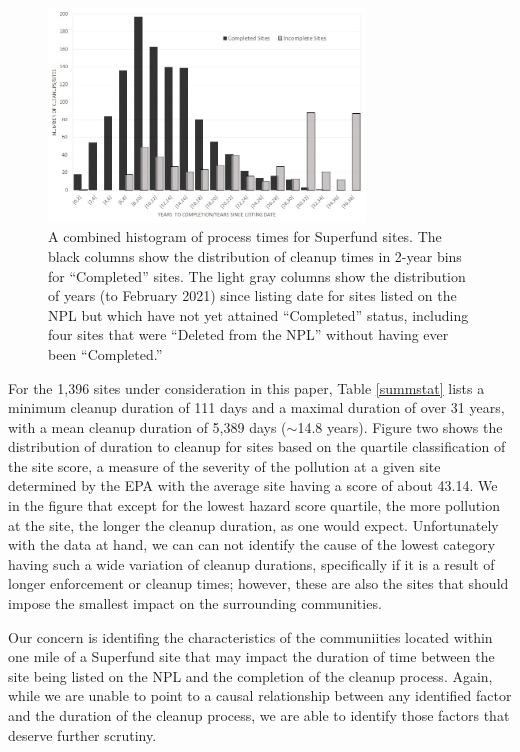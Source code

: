 \documentclass[12pt]{article}
\begin{document}
\begin{figure}[t] \centering
\includegraphics[width=0.75\textwidth]{histogram_combined.jpg}
\caption{A combined histogram of process times for Superfund sites. The black columns show the distribution of cleanup times in 2-year bins for ``Completed'' sites. The light gray columns show the distribution of years (to February 2021) since listing date for sites listed on the NPL but which have not yet attained ``Completed'' status, including four sites that were ``Deleted from the NPL'' without having ever been ``Completed.''
\label{hist1}}
\end{figure}

For the 1,396 sites under consideration in this paper, Table \ref{summstat} lists a minimum cleanup duration of 111 days and a maximal duration of over 31 years, with a mean cleanup duration of 5,389 days ($\sim$14.8 years). Figure two shows the distribution of duration to cleanup for sites based on the quartile classification of the site score, a measure of the severity of the pollution at a given site determined by the EPA with the average site having a score of about 43.14. We in the figure that except for the lowest hazard score quartile, the more pollution at the site, the longer the cleanup duration, as one would expect. Unfortunately with the data at hand, we can can not identify the cause of the lowest category having such a wide variation of cleanup durations, specifically if it is a result of longer enforcement or cleanup times; however, these are also the sites that should impose the smallest impact on the surrounding communities.  


Our concern is identifing the characteristics of the communiities located within one mile of a Superfund site that may impact the duration of time between the site being listed on the NPL and the completion of the cleanup process. Again, while we are unable to point to a causal relationship between any identified factor and the duration of the cleanup process, we are able to identify those factors that deserve further scrutiny. 
\end{document}
